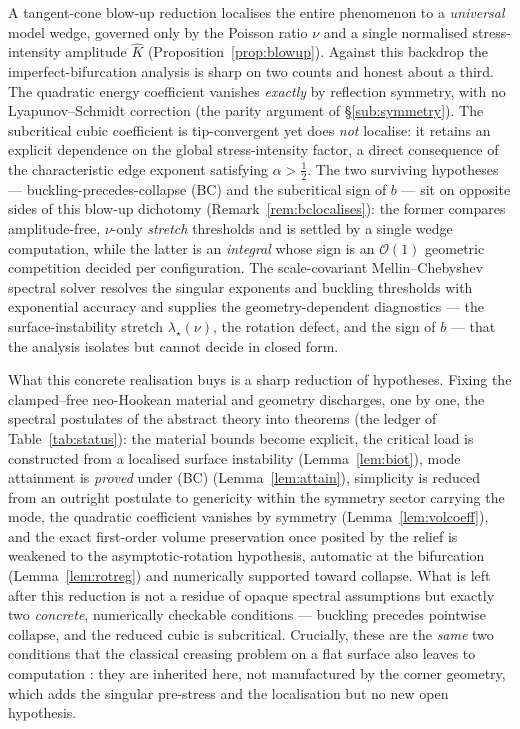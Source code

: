 A tangent-cone blow-up reduction localises the entire phenomenon to a \emph{universal} model wedge, governed only by the
Poisson ratio $\nu$ and a single normalised stress-intensity amplitude $\hat K$ (Proposition~\ref{prop:blowup}). Against
this backdrop the imperfect-bifurcation analysis is sharp on two counts and honest about a third. The quadratic energy
coefficient vanishes \emph{exactly} by reflection symmetry, with no Lyapunov--Schmidt correction (the parity argument of
\S\ref{sub:symmetry}). The subcritical cubic coefficient is tip-convergent yet does \emph{not} localise: it retains an
explicit dependence on the global stress-intensity factor, a direct consequence of the characteristic edge exponent
satisfying $\alpha>\tfrac12$. The two surviving hypotheses --- buckling-precedes-collapse (BC) and the subcritical sign
of $b$ --- sit on opposite sides of this blow-up dichotomy (Remark~\ref{rem:bclocalises}): the former compares
amplitude-free, $\nu$-only \emph{stretch} thresholds and is settled by a single wedge computation, while the latter is an
\emph{integral} whose sign is an $\mathcal{O}(1)$ geometric competition decided per configuration. The scale-covariant
Mellin--Chebyshev spectral solver resolves the singular exponents and buckling thresholds with exponential accuracy and
supplies the geometry-dependent diagnostics --- the surface-instability stretch $\lambda_\star(\nu)$, the rotation
defect, and the sign of $b$ --- that the analysis isolates but cannot decide in closed form.

What this concrete realisation buys is a sharp reduction of hypotheses. Fixing the clamped--free neo-Hookean material and
geometry discharges, one by one, the spectral postulates of the abstract theory into theorems (the ledger of
Table~\ref{tab:status}): the material bounds become explicit, the critical load is constructed from a localised surface
instability (Lemma~\ref{lem:biot}), mode attainment is \emph{proved} under (BC) (Lemma~\ref{lem:attain}), simplicity is
reduced from an outright postulate to genericity within the symmetry sector carrying the mode, the quadratic coefficient
vanishes by symmetry (Lemma~\ref{lem:volcoeff}), and the exact first-order volume preservation once posited by the relief
is weakened to the asymptotic-rotation hypothesis, automatic at the bifurcation (Lemma~\ref{lem:rotreg}) and numerically
supported toward collapse. What is left after this reduction is not a residue of opaque spectral assumptions but exactly
two \emph{concrete}, numerically checkable conditions --- buckling precedes pointwise collapse, and the reduced cubic is
subcritical. Crucially, these are the \emph{same} two conditions that the classical creasing problem on a flat surface
also leaves to computation \cite{Biot1963,Hong2009}: they are inherited here, not manufactured by the corner geometry,
which adds the singular pre-stress and the localisation but no new open hypothesis.

